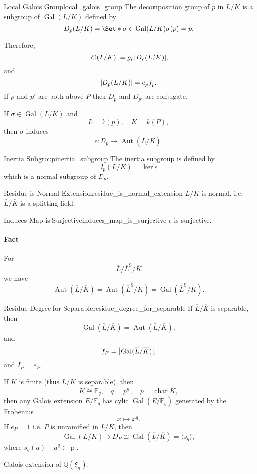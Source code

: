 \documentclass{article}
\begin{document}
\begin{definition}{Local Galois Group}{local_galois_group}
    The decomposition group of $p$ in $L/K$ is a subgroup of $\operatorname{Gal}(L/K)$ defined by
    \[ D_p(L/K) = \Set*{\sigma\in\operatorname{Gal}(L/K)}{\sigma(p) = p}. \]
\end{definition}

Therefore,
\[ \abs{G(L/K)} = g_p \abs{D_p(L/K)}, \]
and
\[ \abs{D_p(L/K)} = e_p f_p. \]
If $p$ and $p'$ are both above $P$ then $D_p$ and $D_{p'}$ are conjugate.
\par
If $\sigma\in\operatorname{Gal}(L/K)$ and
\[ \overline{L} = k(p), \quad \overline{K} = k(P), \]
then $\sigma$ induces
\[ \epsilon: D_p \rightarrow \operatorname{Aut}(\overline{L}/\overline{K}). \]

\begin{definition}{Inertia Subgroup}{inertia_subgroup}
    The inertia subgroup is defined by
    \[ I_p(L/K) = \ker \epsilon \]
    which is a normal subgroup of $D_p$.
\end{definition}

\begin{proposition}{Residue is Normal Extension}{residue_is_normal_extension}
    $\overline{L}/\overline{K}$ is normal, i.e. $\overline{L}/\overline{K}$ is a splitting field.
\end{proposition}

\begin{proposition}{Induces Map is Surjective}{induces_map_is_surjective}
    $\epsilon$ is surjective.
\end{proposition}

\paragraph*{Fact}
For
\[ \overline{L}/\overline{L}^{\mathrm{S}}/\overline{K} \]
we have
\[ \operatorname{Aut}(\overline{L}/\overline{K}) = \operatorname{Aut}(\overline{L}^{\mathrm{S}}/K) = \operatorname{Gal}(\overline{L}^{\mathrm{S}}/K). \]

\begin{corollary}{Residue Degree for Separable}{residue_degree_for_separable}
    If $\overline{L}/\overline{K}$ is separable, then
    \[ \operatorname{Gal}(\overline{L}/\overline{K}) = \operatorname{Aut}(\overline{L}/\overline{K}), \]
    and
    \[ f_P = \abs{\operatorname{Gal}(\overline{L}/\overline{K})}, \]
    and $I_P = e_P$.
\end{corollary}

If $\overline{K}$ is finite (thus $\overline{L}/\overline{K}$ is separable), then
\[ \overline{K} \cong \mathbb{F}_q,\quad q = p^n,\quad p = \operatorname{char} \overline{K}, \]
then any Galois extension $E/\mathbb{F}_q$ has cylic $\operatorname{Gal}(E/\mathbb{F}_q)$ generated by the Frobenius
\[ x \mapsto x^q. \]
If $e_P = 1$ i.e. $P$ is unramified in $L/K$, then
\[ \operatorname{Gal}(L/K) \supset D_P \cong \operatorname{Gal}(\overline{L}/\overline{K}) = \langle s_q \rangle, \]
where $s_q(a) - a^q \in \operatorname{p}$.

\par

Galois extension of $\mathbb{Q}(\xi_n)$.

% 
% 
\end{document}
